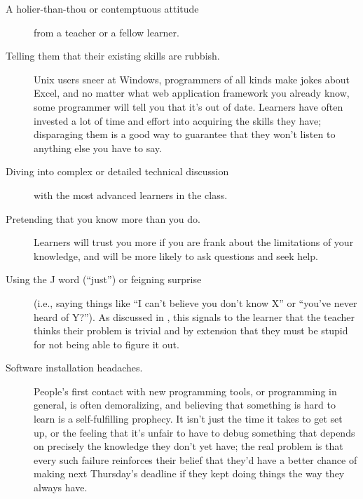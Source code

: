 \begin{description}

\item[A holier-than-thou or contemptuous attitude] from a teacher or a
  fellow learner.

\item[Telling them that their existing skills are rubbish.]  Unix
  users sneer at Windows, programmers of all kinds make jokes about
  Excel, and no matter what web application framework you already
  know, some programmer will tell you that it's out of date.  Learners
  have often invested a lot of time and effort into acquiring the
  skills they have; disparaging them is a good way to guarantee that
  they won't listen to anything else you have to say.

\item[Diving into complex or detailed technical discussion] with the
  most advanced learners in the class.

\item[Pretending that you know more than you do.]  Learners will trust
  you more if you are frank about the limitations of your knowledge,
  and will be more likely to ask questions and seek help.

\item[Using the J word (``just'') or feigning surprise] (i.e., saying
  things like ``I can't believe you don't know X'' or ``you've never
  heard of Y?''). As discussed in , this signals to
  the learner that the teacher thinks their problem is trivial and by
  extension that they must be stupid for not being able to figure it
  out.

\item[Software installation headaches.] People's first contact with
  new programming tools, or programming in general, is often
  demoralizing, and believing that something is hard to learn is a
  self-fulfilling prophecy.  It isn't just the time it takes to get
  set up, or the feeling that it's unfair to have to debug something
  that depends on precisely the knowledge they don't yet have; the
  real problem is that every such failure reinforces their belief that
  they'd have a better chance of making next Thursday's deadline if
  they kept doing things the way they always have.

\end{description}

